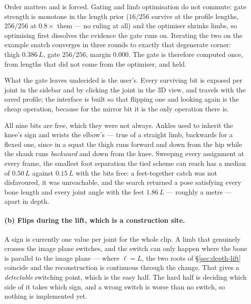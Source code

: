 \documentclass[10pt,a4paper]{article}
\newcommand{\Lt}{L}                      %
\begin{document}
Order matters and is forced. Gating and limb optimisation do not commute: gate
strength is monotone in the length prior ($16/256$ survive at the profile
lengths, $256/256$ at $0.8\times$ them --- no ruling at all) and the optimiser
shrinks limbs, so optimising first dissolves the evidence the gate runs on.
Iterating the two on the example snatch converges in three rounds to exactly
that degenerate corner: thigh $0.386\,\Lt$, gate $256/256$, margin $0.000$. The
gate is therefore computed once, from lengths that did not come from the
optimiser, and held.

What the gate leaves undecided is the user's. Every surviving bit is exposed
per joint in the sidebar and by clicking the joint in the 3D view, and travels
with the saved profile; the interface is built so that flipping one and looking
again is the cheap operation, because for the mirror bit it is the only
operation there is.

All nine bits are free, which they were not always. Ankles used to inherit the
knee's sign and wrists the elbow's --- true of a straight limb, backwards for a
flexed one, since in a squat the thigh runs forward and down from the hip while
the shank runs \emph{backward} and down from the knee. Sweeping every
assignment at every frame, the smallest foot separation the tied scheme can
reach has a median of $0.50\,\Lt$ against $0.15\,\Lt$ with the bits free: a
feet-together catch was not disfavoured, it was unreachable, and the search
returned a pose satisfying every bone length and every joint angle with the
feet $1.86\,\Lt$ --- roughly a metre --- apart in depth.

\paragraph{(b) Flips during the lift, which is a construction site.} A sign is
currently one value per joint for the whole clip. A limb that genuinely crosses
the image plane switches, and the switch can only happen where the bone is
parallel to the image plane --- where $\ell=L$, the two roots of
\S\ref{sec:depth-lift} coincide and the reconstruction is continuous through
the change. That gives a \emph{detectable} switching point, which is the easy
half. The hard half is deciding which side of it takes which sign, and a wrong
switch is worse than no switch, so nothing is implemented yet.
\end{document}
